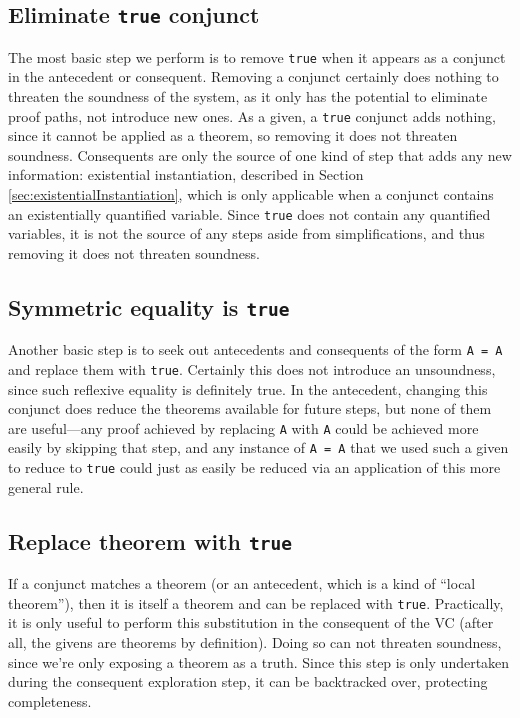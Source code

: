 	\subsection{Eliminate \texttt{true} conjunct\label{sec:eliminateTrue}}
The most basic step we perform is to remove \texttt{true} when it appears as a conjunct in the antecedent or consequent.  Removing a conjunct certainly does nothing to threaten the soundness of the system, as it only has the potential to eliminate proof paths, not introduce new ones.  As a given, a \texttt{true} conjunct adds nothing, since it cannot be applied as a theorem, so removing it does not threaten soundness.  Consequents are only the source of one kind of step that adds any new information: existential instantiation, described in Section \ref{sec:existentialInstantiation}, which is only applicable when a conjunct contains an existentially quantified variable.  Since \texttt{true} does not contain any quantified variables, it is not the source of any steps aside from simplifications, and thus removing it does not threaten soundness.

	\subsection{Symmetric equality is \texttt{true}}
Another basic step is to seek out antecedents and consequents of the form \texttt{A~=~A} and replace them with \texttt{true}.  Certainly this does not introduce an unsoundness, since such reflexive equality is definitely true.  In the antecedent, changing this conjunct does reduce the theorems available for future steps, but none of them are useful---any proof achieved by replacing \texttt{A} with \texttt{A} could be achieved more easily by skipping that step, and any instance of \texttt{A~=~A} that we used such a given to reduce to \texttt{true} could just as easily be reduced via an application of this more general rule.

	\subsection{Replace theorem with \texttt{true}}
If a conjunct matches a theorem (or an antecedent, which is a kind of ``local theorem''), then it is itself a theorem and can be replaced with \texttt{true}.  Practically, it is only useful to perform this substitution in the consequent of the VC (after all, the givens are theorems by definition).  Doing so can not threaten soundness, since we're only exposing a theorem as a truth.  Since this step is only undertaken during the consequent exploration step, it can be backtracked over, protecting completeness.

